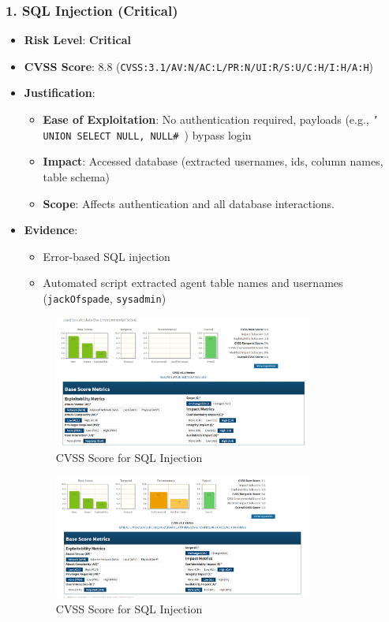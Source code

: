 \documentclass[12pt]{article}
\begin{document}
\subsubsection*{1. SQL Injection (Critical)}
\begin{itemize}
    \item \textbf{Risk Level}: \textcolor{critical}{\textbf{Critical}}
    \item \textbf{CVSS Score}: 8.8 (\texttt{CVSS:3.1/AV:N/AC:L/PR:N/UI:R/S:U/C:H/I:H/A:H})
    \item \textbf{Justification}:
    \begin{itemize}
        \item \textbf{Ease of Exploitation}: No authentication required, payloads (e.g., \texttt{' UNION SELECT NULL, NULL\# }) bypass login
        \item \textbf{Impact}: Accessed database (extracted usernames, ids, column names, table schema)
        \item \textbf{Scope}: Affects authentication and all database interactions.
    \end{itemize}
    \item \textbf{Evidence}:
    \begin{itemize}
        \item Error-based SQL injection
        \item Automated script extracted agent table names and usernames (\texttt{jackOfspade}, \texttt{sysadmin})
    \end{itemize}
    \begin{figure}[h!]
    \centering
    \includegraphics[width=0.8\textwidth]{RA1.png}
    \caption{CVSS Score for SQL Injection}
    \label{fig:sql_injection}
    \end{figure}
    \begin{figure}[h!]
    \centering
    \includegraphics[width=0.8\textwidth]{RA11.png}
    \caption{CVSS Score for SQL Injection}
    \label{fig:sql_injection}
    \end{figure}
    
    \FloatBarrier
\end{itemize}
\end{document}
